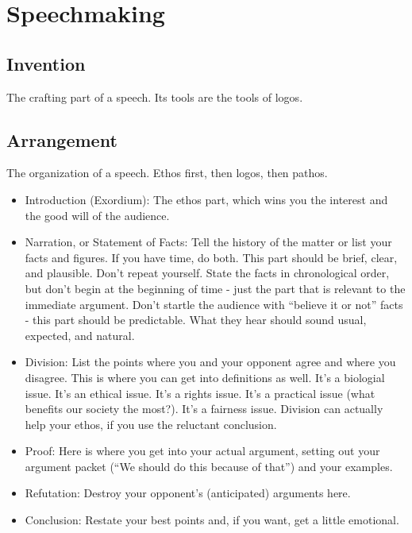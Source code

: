 \section{Speechmaking}
\subsection{Invention}
The crafting part of a speech. Its tools are the tools of logos.

\subsection{Arrangement}
The organization of a speech. Ethos first, then logos, then pathos.
\begin{itemize}
	\item Introduction (Exordium): The ethos part, which wins you the interest and the good will of the audience. 
	\item Narration, or Statement of Facts: Tell the history of the matter or list your facts and figures. If you have time, do both. This part should be brief, clear, and plausible. Don't repeat yourself. State the facts in chronological order, but don't begin at the beginning of time - just the part that is relevant to the immediate argument. Don't startle the audience with ``believe it or not'' facts - this part should be predictable. What they hear should sound usual, expected, and natural.
	\item Division: List the points where you and your opponent agree and where you disagree. This is where you can get into definitions as well. It's a biologial issue. It's an ethical issue. It's a rights issue. It's a practical issue (what benefits our society the most?). It's a fairness issue. Division can actually help your ethos, if you use the reluctant conclusion.
	\item Proof: Here is where you get into your actual argument, setting out your argument packet (``We should do this because of that'') and your examples.
	\item Refutation: Destroy your opponent's (anticipated) arguments here.
	\item Conclusion: Restate your best points and, if you want, get a little emotional.
\end{itemize}


